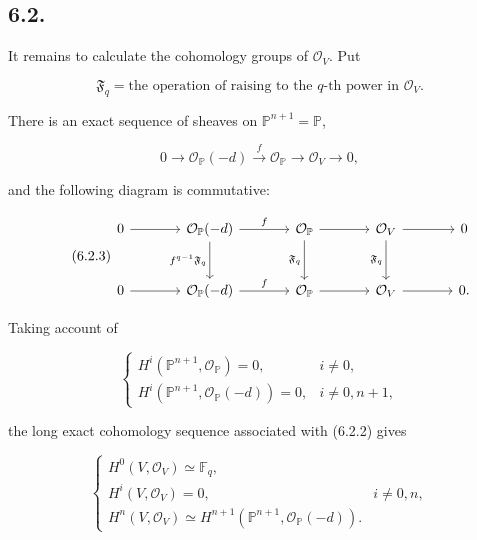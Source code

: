\subsection*{6.2.}
It remains to calculate the cohomology groups of $\mathcal O_V$.
Put

\begin{equation}\tag{6.2.1}
\mathfrak F_q
=\text{the operation of raising to the $q$-th power in $\mathcal O_V$}.
\end{equation}

There is an exact sequence of sheaves on
$\mathbb P^{n+1}=\mathbb P$,

\begin{equation}\tag{6.2.2}
0\longrightarrow\mathcal O_{\mathbb P}(-d)
\xrightarrow{\,f\,}\mathcal O_{\mathbb P}
\longrightarrow\mathcal O_V\longrightarrow0,
\end{equation}

and the following diagram is commutative:

\begin{equation}\tag{6.2.3}
\begin{tikzcd}[column sep=large,row sep=large]
0 \arrow[r] &
\mathcal O_{\mathbb P}(-d) \arrow[r,"f"] \arrow[d,"f^{q-1}\mathfrak F_q"'] &
\mathcal O_{\mathbb P} \arrow[r] \arrow[d,"\mathfrak F_q"'] &
\mathcal O_V \arrow[r] \arrow[d,"\mathfrak F_q"'] &
0\\
0 \arrow[r] &
\mathcal O_{\mathbb P}(-d) \arrow[r,"f"] &
\mathcal O_{\mathbb P} \arrow[r] &
\mathcal O_V \arrow[r] &
0 .
\end{tikzcd}
\end{equation}

Taking account of

\begin{equation}\tag{6.2.4}
\begin{cases}
H^i(\mathbb P^{n+1},\mathcal O_{\mathbb P})=0,
&i\ne0,\\
H^i(\mathbb P^{n+1},\mathcal O_{\mathbb P}(-d))=0,
&i\ne0,n+1,
\end{cases}
\end{equation}

the long exact cohomology sequence associated with (6.2.2) gives

\begin{equation}\tag{6.2.5}
\begin{cases}
H^0(V,\mathcal O_V)\simeq\mathbb F_q,\\
H^i(V,\mathcal O_V)=0,&i\ne0,n,\\
H^n(V,\mathcal O_V)
\simeq H^{n+1}(\mathbb P^{n+1},\mathcal O_{\mathbb P}(-d)).
\end{cases}
\end{equation}

